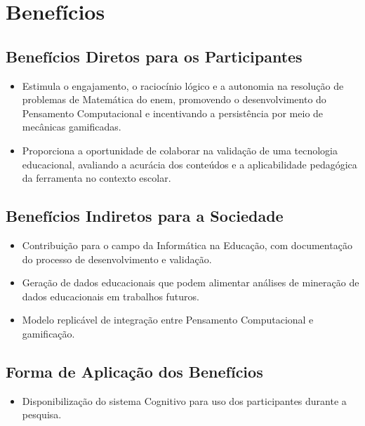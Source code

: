 \chapter{Benefícios}

\section{Benefícios Diretos para os Participantes}

\begin{itemize}
    \item Estimula o engajamento, o raciocínio lógico e a autonomia na resolução de problemas de Matemática do \gls{enem}, promovendo o desenvolvimento do Pensamento Computacional e incentivando a persistência por meio de mecânicas gamificadas.
    \item Proporciona a oportunidade de colaborar na validação de uma tecnologia educacional, avaliando a acurácia dos conteúdos e a aplicabilidade pedagógica da ferramenta no contexto escolar.
\end{itemize}

\section{Benefícios Indiretos para a Sociedade}

\begin{itemize}
    \item Contribuição para o campo da Informática na Educação, com documentação do processo de desenvolvimento e validação.
    \item Geração de dados educacionais que podem alimentar análises de mineração de dados educacionais em trabalhos futuros.
    \item Modelo replicável de integração entre Pensamento Computacional e gamificação.
\end{itemize}

\section{Forma de Aplicação dos Benefícios}

\begin{itemize}
    \item Disponibilização do sistema Cognitivo para uso dos participantes durante a pesquisa.
\end{itemize}